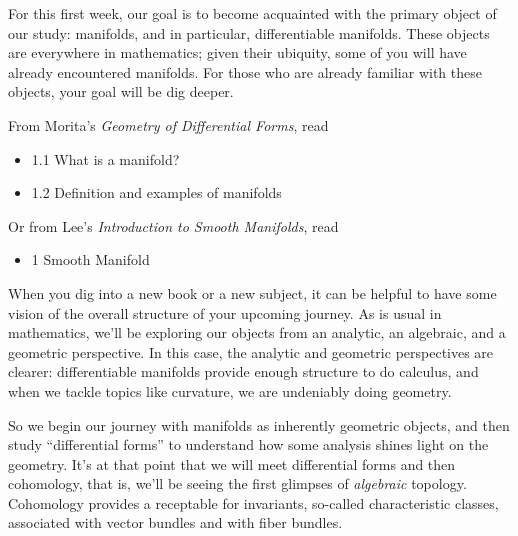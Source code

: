 \documentclass{homework}
\author{Jim Fowler}
\date{Week 1: Manifolds}
\begin{document}
\maketitle

For this first week, our goal is to become acquainted with the primary
object of our study: manifolds, and in particular, differentiable
manifolds.  These objects are everywhere in mathematics; given their
ubiquity, some of you will have already encountered manifolds.  For
those who are already familiar with these objects, your goal will be
dig deeper.

From Morita's \textit{Geometry of Differential Forms}, read
\begin{itemize}
\item 1.1 What is a manifold?
\item 1.2 Definition and examples of manifolds
\end{itemize}
Or from Lee's \textit{Introduction to Smooth Manifolds}, read
\begin{itemize}
\item 1 Smooth Manifold
\end{itemize}

When you dig into a new book or a new subject, it can be helpful to
have some vision of the overall structure of your upcoming journey.
As is usual in mathematics, we'll be exploring our objects from an
analytic, an algebraic, and a geometric perspective.  In this case,
the analytic and geometric perspectives are clearer: differentiable
manifolds provide enough structure to do calculus, and when we tackle
topics like curvature, we are undeniably doing geometry.

So we begin our journey with manifolds as inherently geometric
objects, and then study ``differential forms'' to understand how some
analysis shines light on the geometry.  It's at that point that we
will meet differential forms and then cohomology, that is, we'll be
seeing the first glimpses of \textit{algebraic} topology.  Cohomology
provides a receptable for invariants, so-called characteristic
classes, associated with vector bundles and with fiber bundles.
\end{document}
